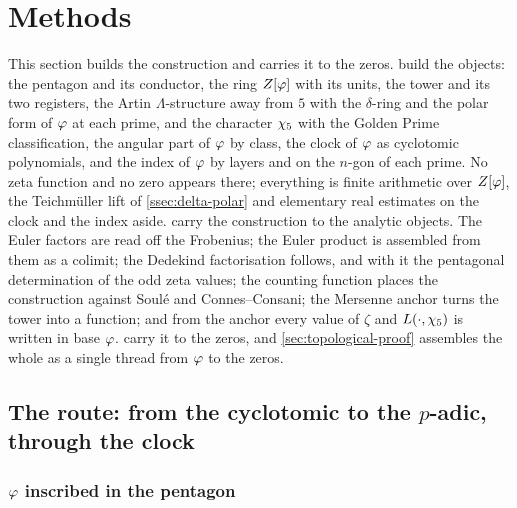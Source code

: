 \section{Methods}\label{sec:methods}

This section builds the construction and carries it to the zeros.
 build the objects: the pentagon and its conductor, the ring
$Z[\varphi]$ with its units, the tower and its two registers, the Artin $\Lambda$-structure away from
$5$ with the $\delta$-ring and the polar form of $\varphi$ at each prime, and the character $\chi_5$
with the Golden Prime classification, the angular part of $\varphi$ by class, the clock of
$\varphi$ as cyclotomic polynomials, and the index of $\varphi$ by layers and on the $n$-gon of each
prime.  No zeta
function and no zero appears there; everything is finite arithmetic over $Z[\varphi]$, the
Teichm\"uller lift of \cref{ssec:delta-polar} and elementary real estimates on the clock and
the index aside.   carry the
construction to the analytic objects.  The Euler factors are read off the Frobenius; the Euler
product is assembled from them as a colimit; the Dedekind factorisation follows, and with it the
pentagonal determination of the odd zeta values; the counting function places the construction
against Soul\'e and Connes--Consani; the Mersenne anchor turns the tower into a function; and from
the anchor every value of $\zeta$ and $L(\cdot,\chi_5)$ is written in base $\varphi$.
 carry it to the zeros, and \cref{sec:topological-proof} assembles the whole as a single thread from $\varphi$ to the zeros.

\subsection{The route: from the cyclotomic to the
$p$-adic, through the clock}\label{sec:choice}

\subsubsection{$\varphi$ inscribed in the pentagon}

